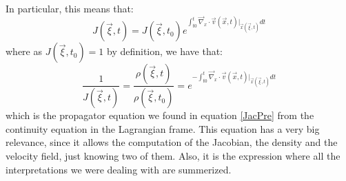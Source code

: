 \documentclass[11pt, a4paper]{article} %
\begin{document}
{In particular, this means that:
\begin{equation}
J(\vec{\xi},t)=J(\vec{\xi},t_0)e^{\int_{t0}^t \vec{\nabla}_x\cdot\vec{v}(\vec{x},t)\Big\rvert_{\vec{x}(\vec{\xi},t)}dt}
\end{equation}
where as $J(\vec{\xi},t_0)=1$ by definition, we have that:
\begin{equation}
\frac{1}{J(\vec{\xi},t)}=\frac{\rho(\vec{\xi},t)}{\rho(\vec{\xi},t_0)}=e^{-\int_{t0}^t \vec{\nabla}_x\cdot\vec{v}(\vec{x},t)\Big\rvert_{\vec{x}(\vec{\xi},t)}dt}
\end{equation}
which is the propagator equation we found in equation \eqref{JacPre} from the continuity equation in the Lagrangian frame. This equation has a very big relevance, since it allows the computation of the Jacobian, the density and the velocity field, just knowing two of them. Also, it is the expression where all the interpretations we were dealing with are summerized.
}
\newpage
\end{document}
